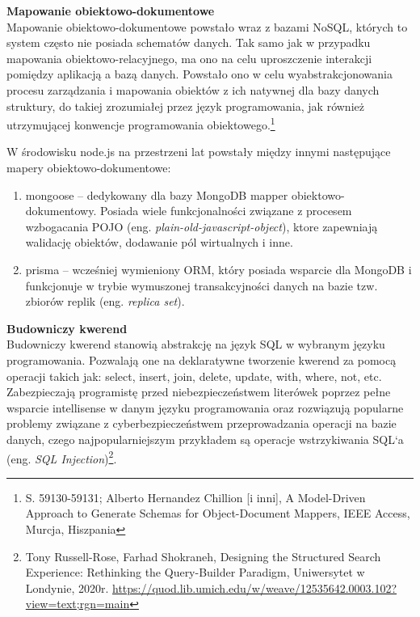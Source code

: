 \documentclass[12pt, a4paper, twoside, openany]{book}
\newcommand{\forceindent}{\leavevmode{\parindent=1.3em\indent}}
\begin{document}
\newpage
\textbf{Mapowanie obiektowo-dokumentowe\\}
\forceindent Mapowanie obiektowo-dokumentowe powstało wraz z bazami NoSQL, których to system często nie posiada schematów danych.
Tak samo jak w przypadku mapowania obiektowo-relacyjnego, ma ono na celu uproszczenie interakcji pomiędzy aplikacją a bazą danych. Powstało ono w celu wyabstrakcjonowania procesu zarządzania i mapowania obiektów z ich natywnej dla bazy danych struktury, do takiej zrozumiałej przez język programowania, jak również utrzymującej konwencje programowania obiektowego.\footnote{S. 59130-59131; Alberto Hernandez Chillion [i inni], A Model-Driven Approach to Generate Schemas for Object-Document Mappers, IEEE Access, Murcja, Hiszpania}

W środowisku node.js na przestrzeni lat powstały między innymi następujące mapery obiektowo-dokumentowe:
\begin{enumerate}[label=--]
    \item mongoose -- dedykowany dla bazy MongoDB mapper obiektowo-dokumentowy. Posiada wiele funkcjonalności związane z procesem wzbogacania POJO (eng. \textit{plain-old-javascript-object}), ktore zapewniają walidację obiektów, dodawanie pól wirtualnych i inne.
    \item prisma -- wcześniej wymieniony ORM, który posiada wsparcie dla MongoDB i funkcjonuje w trybie wymuszonej transakcyjności danych na bazie tzw. zbiorów replik (eng. \textit{replica set}).
\end{enumerate}

\textbf{Budowniczy kwerend\\}
\forceindent  Budowniczy kwerend stanowią abstrakcję na język SQL w wybranym języku programowania.
Pozwalają one na deklaratywne tworzenie kwerend za pomocą operacji takich jak: select, insert, join, delete, update, with, where, not, etc.
Zabezpieczają programistę przed niebezpieczeństwem literówek poprzez pełne wsparcie intellisense w danym języku programowania oraz rozwiązują popularne problemy związane z cyberbezpieczeństwem przeprowadzania operacji na bazie danych, czego najpopularniejszym przykładem są operacje wstrzykiwania SQL`a (eng. \textit{SQL Injection})\footnote{Tony Russell-Rose, Farhad Shokraneh, Designing the Structured Search Experience: Rethinking the Query-Builder Paradigm, Uniwersytet w Londynie, 2020r. \url{https://quod.lib.umich.edu/w/weave/12535642.0003.102?view=text;rgn=main}}.
\end{document}
